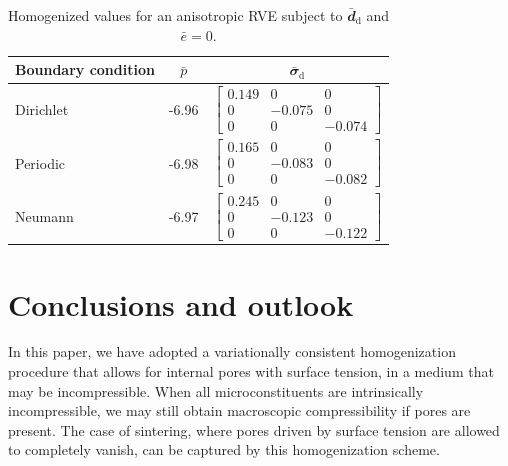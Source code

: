 \documentclass[12pt,a4paper]{article}
\renewcommand{\ts}[1]{\mathbfit{#1}}
\renewcommand{\dev}{\mathrm{d}}
\begin{document}
\begin{table}[htbp!]
 \centering
\renewcommand{\arraystretch}{1.75}
 \begin{tabular}{l|c|c}
  Boundary condition & $\bar{p}$ & $\bar{\ts\sigma}_\dev$ 
\\\hline
  Dirichlet          & -6.96     & $ \left[\begin{smallmatrix} 0.149 & 0 & 0 \\ 0 & -0.075 & 0 \\ 0 & 0 & -0.074 \end{smallmatrix}\right] $
\\\hline
  Periodic           & -6.98     & $ \left[\begin{smallmatrix} 0.165 & 0 & 0 \\ 0 & -0.083 & 0 \\ 0 & 0 & -0.082 \end{smallmatrix}\right] $
\\\hline
  Neumann            & -6.97     & $ \left[\begin{smallmatrix} 0.245 & 0 & 0 \\ 0 & -0.123 & 0 \\ 0 & 0 & -0.122 \end{smallmatrix}\right] $
 \end{tabular}
 \caption{Homogenized values for an anisotropic RVE subject to $\bar{\ts d}_\dev$ and $\bar{e} = 0$.}
 \label{tab:aniso}
\end{table}


\section{Conclusions and outlook}

In this paper, we have adopted a variationally consistent homogenization procedure that allows for internal pores with surface tension, in a medium that may be incompressible.
When all microconstituents are intrinsically incompressible, we may still obtain macroscopic compressibility if pores are present.
The case of sintering, where pores driven by surface tension are allowed to completely vanish, can be captured by this homogenization scheme.
\end{document}
